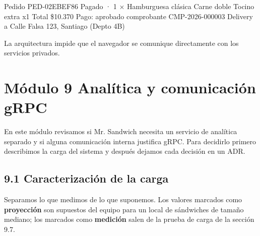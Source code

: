 \documentclass[10pt,letterpaper]{article}
\begin{document}
\textquotedbl{}Pedido PED-02EBEF86  Pagado · 1 × Hamburguesa clásica  Carne doble  Tocino extra x1  Total \$10.370  Pago: aprobado  comprobante CMP-2026-000003  Delivery a Calle Falsa 123, Santiago (Depto 4B)\textquotedbl{}

La arquitectura impide que el navegador se comunique directamente con los servicios privados. 


\section*{Módulo 9 Analítica y comunicación gRPC}
En este módulo revisamos si Mr. Sandwich necesita un servicio de analítica separado y si alguna comunicación interna justifica gRPC. Para decidirlo primero describimos la carga del sistema y después dejamos cada decisión en un ADR.


\subsection*{9.1 Caracterización de la carga}
Separamos lo que medimos de lo que suponemos. Los valores marcados como \textbf{proyección} son supuestos del equipo para un local de sándwiches de tamaño mediano; los marcados como \textbf{medición} salen de la prueba de carga de la sección 9.7.
\end{document}
